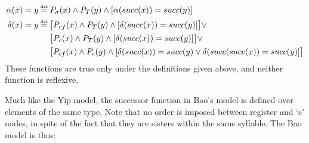 \documentclass{article}
\newcommand\myeq{\mathrel{\stackrel{\makebox[0pt]{\mbox{\normalfont\tiny def}}}{=}}}
\begin{document}
\begin{equation}
\begin{aligned}
\alpha(x)=y&\myeq P_{\sigma}(x)\land P_{T}(y)\land[\alpha(succ(x))=succ(y)]\\
\delta(x)=y&\myeq \big[P_{rf}(x)\land P_{T}(y)\land[\delta(succ(x))=succ(y)]\big]\lor \\
&\quad \, \, \big[P_{c}(x)\land P_{T}(y)\land[\delta(succ(x))=succ(y)]\big]\lor \\
&\quad \, \, \big[P_{cf}(x)\land P_{c}(y)\land[\delta(succ(x))=succ(y)\lor \delta(succ(succ(x))=succ(y)]\big]\\
\end{aligned}
\end{equation}
These functions are true only under the definitions given above, and neither function is reflexive. \par
Much like the Yip model, the successor function in Bao's model is defined over elements of the same type. Note that no order is imposed between register and `c' nodes, in spite of the fact that they are sisters within the same syllable. The Bao model is thus:
\end{document}
